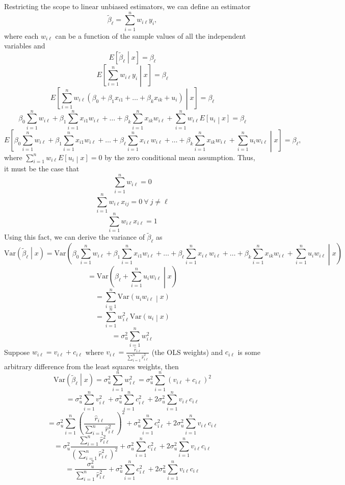 \documentclass[11pt]{article}
\begin{document}
Restricting the scope to linear unbiased estimators, we can define an estimator$$\tilde{\beta}_\ell=\sum_{i=1}^{n}w_{i\ell}y_i,$$
where each $w_{i\ell}$ can be a function of the sample values of all the independent variables and
$$E\left[\tilde{\beta}_\ell\middle|x\right]=\beta_\ell$$
$$E\left[\sum_{i=1}^{n}w_{i\ell}y_i\middle|x\right]=\beta_\ell$$
$$E\left[\sum_{i=1}^{n}w_{i\ell}\left(\beta_0+\beta_1x_{i1}+\dots+\beta_kx_{ik}+u_i\right)\middle|x\right]=\beta_\ell$$
$$\beta_0\sum_{i=1}^{n}w_{i\ell}+\beta_1\sum_{i=1}^{n}x_{i1}w_{i\ell}+\dots+\beta_k\sum_{i=1}^{n}x_{ik}w_{i\ell}+\sum_{i=1}^{n}w_{i\ell}E\left[u_i\middle|x\right]=\beta_\ell$$
$$E\left[\beta_0\sum_{i=1}^{n}w_{i\ell}+\beta_1\sum_{i=1}^{n}x_{i1}w_{i\ell}+\dots+\beta_{\ell}\sum_{i=1}^{n}x_{i\ell}w_{i\ell}+\dots+\beta_k\sum_{i=1}^{n}x_{ik}w_{i\ell}+\sum_{i=1}^{n}u_iw_{i\ell}\middle|x\right]=\beta_\ell,$$
where $\sum_{i=1}^{n}w_{i\ell}E\left[u_i\middle|x\right]=0$ by the zero conditional mean assumption. Thus, it must be the case that
$$\sum_{i=1}^{n}w_{i\ell}=0$$
$$\sum_{i=1}^{n}w_{i\ell}x_{ij}=0\ \forall \ j\neq\ell$$
$$\sum_{i=1}^{n}w_{i\ell}x_{i\ell}=1$$
Using this fact, we can derive the variance of $\tilde{\beta}_\ell$ as
$$\text{Var}\left(\tilde{\beta}_\ell\middle|x\right)=\text{Var}\left(\beta_0\sum_{i=1}^{n}w_{i\ell}+\beta_1\sum_{i=1}^{n}x_{i1}w_{i\ell}+\dots+\beta_{\ell}\sum_{i=1}^{n}x_{i\ell}w_{i\ell}+\dots+\beta_k\sum_{i=1}^{n}x_{ik}w_{i\ell}+\sum_{i=1}^{n}u_iw_{i\ell}\middle|x\right)$$
$$=\text{Var}\left(\beta_{\ell}+\sum_{i=1}^{n}u_iw_{i\ell}\middle|x\right)$$
$$=\sum_{i=1}^{n}\text{Var}\left(u_iw_{i\ell}\middle|x\right)$$
$$=\sum_{i=1}^{n}w_{i\ell}^2\text{Var}\left(u_i\middle|x\right)$$
$$=\sigma_u^2\sum_{i=1}^{n}w_{i\ell}^2$$
Suppose $w_{i\ell}=v_{i\ell}+c_{i\ell}$ where $v_{i\ell}=\frac{\hat{r}_{i\ell}}{\sum_{i=1}^{n}\hat{r}_{i\ell}^2}$ (the OLS weights) and $c_{i\ell}$
is some arbitrary difference from the least squares weights, then
$$\text{Var}\left(\tilde{\beta}_\ell\middle|x\right)=\sigma_u^2\sum_{i=1}^{n}w_{i\ell}^2=\sigma_u^2\sum_{i=1}^{n}\left(v_{i\ell}+c_{i\ell}\right)^2$$
$$=\sigma_u^2\sum_{i=1}^{n}v_{i\ell}^2+\sigma_u^2\sum_{i=1}^{n}c_{i\ell}^2+2\sigma_u^2\sum_{i=1}^{n}v_{i\ell}c_{i\ell}$$
$$=\sigma_u^2\sum_{i=1}^{n}\left(\frac{\hat{r}_{i\ell}}{\sum_{i=1}^{n}\hat{r}_{i\ell}^2}\right)^2+\sigma_u^2\sum_{i=1}^{n}c_{i\ell}^2+2\sigma_u^2\sum_{i=1}^{n}v_{i\ell}c_{i\ell}$$
$$=\sigma_u^2\frac{\sum_{i=1}^{n}\hat{r}_{i\ell}^2}{\left(\sum_{i=1}^{n}\hat{r}_{i\ell}^2\right)^2}+\sigma_u^2\sum_{i=1}^{n}c_{i\ell}^2+2\sigma_u^2\sum_{i=1}^{n}v_{i\ell}c_{i\ell}$$
$$=\frac{\sigma_u^2}{\sum_{i=1}^{n}\hat{r}_{i\ell}^2}+\sigma_u^2\sum_{i=1}^{n}c_{i\ell}^2+2\sigma_u^2\sum_{i=1}^{n}v_{i\ell}c_{i\ell}$$
\end{document}
